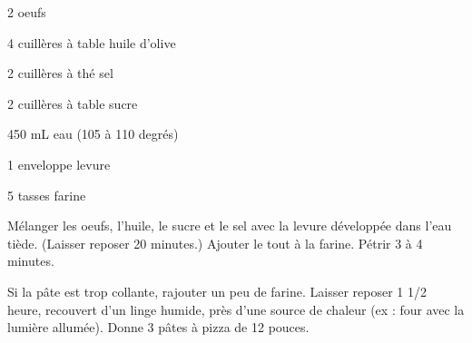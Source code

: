 



\totaltime{}


\begin{ingredients}
    \item 2 oeufs
    \item 4 cuillères à table huile d'olive
    \item 2 cuillères à thé sel
    \item 2 cuillères à table sucre
    \item 450 mL eau (105 à 110 degrés)
    \item 1 enveloppe levure
    \item 5 tasses farine
\end{ingredients}

\begin{steps}
    \item Mélanger les oeufs, l'huile, le sucre et le sel avec la levure développée dans l'eau tiède. (Laisser reposer 20 minutes.) Ajouter le tout à la farine. Pétrir 3 à 4 minutes.
    \item Si la pâte est trop collante, rajouter un peu de farine. Laisser reposer 1 1/2 heure, recouvert d'un linge humide, près d'une source de chaleur (ex : four avec la lumière allumée). Donne 3 pâtes à pizza de 12 pouces.
\end{steps}
